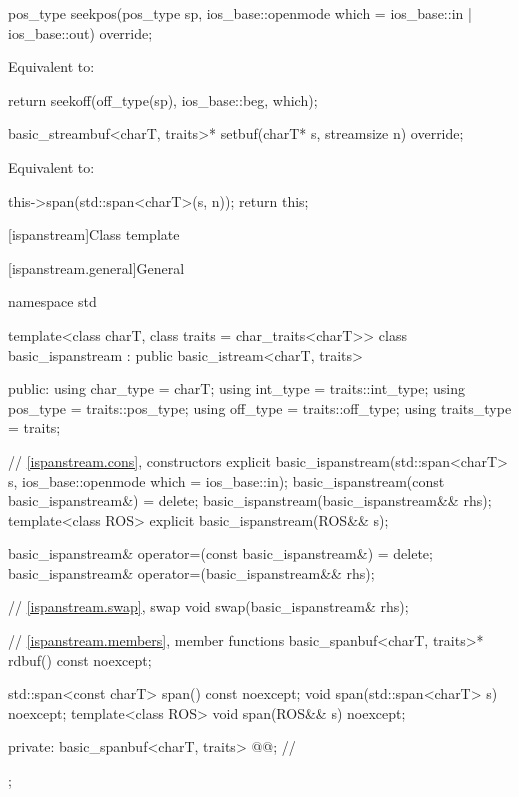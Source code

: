 %
\begin{itemdecl}
pos_type seekpos(pos_type sp, ios_base::openmode which = ios_base::in | ios_base::out) override;
\end{itemdecl}

\begin{itemdescr}
\pnum
\effects
Equivalent to:
\begin{codeblock}
return seekoff(off_type(sp), ios_base::beg, which);
\end{codeblock}
\end{itemdescr}

%
\begin{itemdecl}
basic_streambuf<charT, traits>* setbuf(charT* s, streamsize n) override;
\end{itemdecl}

\begin{itemdescr}
\pnum
\effects
Equivalent to:
\begin{codeblock}
this->span(std::span<charT>(s, n));
return this;
\end{codeblock}
\end{itemdescr}

[ispanstream]{Class template }

[ispanstream.general]{General}

%
\begin{codeblock}
namespace std {
  template<class charT, class traits = char_traits<charT>>
  class basic_ispanstream
    : public basic_istream<charT, traits> {
  public:
    using char_type   = charT;
    using int_type    = traits::int_type;
    using pos_type    = traits::pos_type;
    using off_type    = traits::off_type;
    using traits_type = traits;

    // \ref{ispanstream.cons}, constructors
    explicit basic_ispanstream(std::span<charT> s,
                               ios_base::openmode which = ios_base::in);
    basic_ispanstream(const basic_ispanstream&) = delete;
    basic_ispanstream(basic_ispanstream&& rhs);
    template<class ROS> explicit basic_ispanstream(ROS&& s);

    basic_ispanstream& operator=(const basic_ispanstream&) = delete;
    basic_ispanstream& operator=(basic_ispanstream&& rhs);

    // \ref{ispanstream.swap}, swap
    void swap(basic_ispanstream& rhs);

    // \ref{ispanstream.members}, member functions
    basic_spanbuf<charT, traits>* rdbuf() const noexcept;

    std::span<const charT> span() const noexcept;
    void span(std::span<charT> s) noexcept;
    template<class ROS> void span(ROS&& s) noexcept;

  private:
    basic_spanbuf<charT, traits> @@;    // \expos
  };
}
\end{codeblock}

